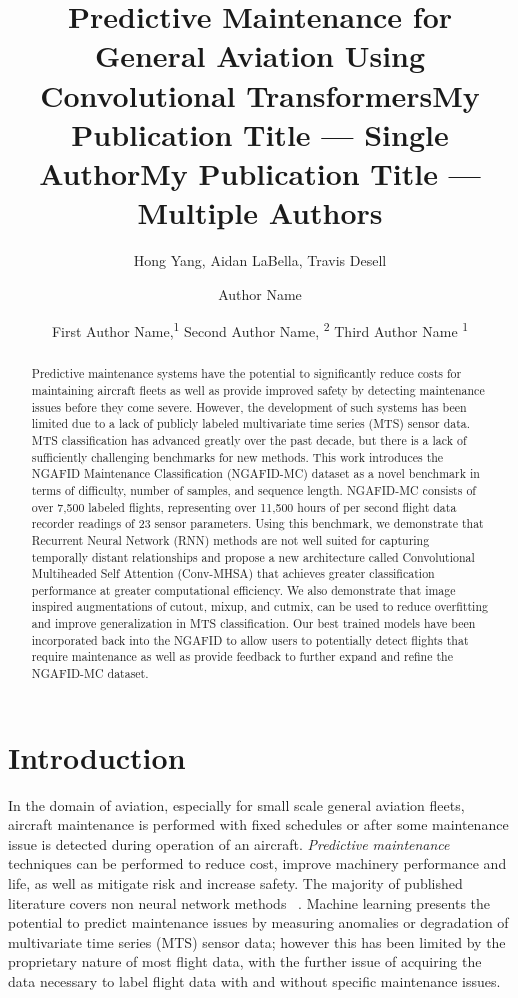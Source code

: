 \documentclass[letterpaper]{article} %
\title{Predictive Maintenance for General Aviation Using Convolutional Transformers}
\author{
    Hong Yang,
    Aidan LaBella,
    Travis Desell
}
\title{My Publication Title --- Single Author}
\author {
    Author Name
}
\title{My Publication Title --- Multiple Authors}
\author {
    First Author Name,\textsuperscript{\rm 1}
    Second Author Name, \textsuperscript{\rm 2}
    Third Author Name \textsuperscript{\rm 1}
}
\begin{document}
\maketitle

\begin{abstract}
Predictive maintenance systems have the potential to significantly reduce costs for maintaining aircraft fleets as well as provide improved safety by detecting maintenance issues before they come severe. However, the development of such systems has been limited due to a lack of publicly labeled multivariate time series (MTS) sensor data. MTS classification has advanced greatly over the past decade, but there is a lack of sufficiently challenging benchmarks for new methods. This work introduces the NGAFID Maintenance Classification (NGAFID-MC) dataset as a novel benchmark in terms of difficulty, number of samples, and sequence length. NGAFID-MC consists of over 7,500 labeled flights, representing over 11,500 hours of per second flight data recorder readings of 23 sensor parameters. Using this benchmark, we demonstrate that Recurrent Neural Network (RNN) methods are not well suited for capturing temporally distant relationships and propose a new architecture called Convolutional Multiheaded Self Attention (Conv-MHSA) that achieves greater classification performance at greater computational efficiency. We also demonstrate that image inspired augmentations of cutout, mixup, and cutmix, can be used to reduce overfitting and improve generalization in MTS classification.  Our best trained models have been incorporated back into the NGAFID to allow users to potentially detect flights that require maintenance as well as provide feedback to further expand and refine the NGAFID-MC dataset.
\end{abstract}



\section{Introduction}

In the domain of aviation, especially for small scale general aviation fleets, aircraft maintenance is performed with fixed schedules or after some maintenance issue is detected during operation of an aircraft. \emph{Predictive maintenance} techniques can be performed to reduce cost, improve machinery performance and life, as well as mitigate risk and increase safety. The majority of published literature covers non neural network methods ~\cite{PredModel-CARVALHO2019106024}.  Machine learning presents the potential to predict maintenance issues by measuring anomalies or degradation of multivariate time series (MTS) sensor data; however this has been limited by the proprietary nature of most flight data, with the further issue of acquiring the data necessary to label flight data with and without specific maintenance issues.
\end{document}
